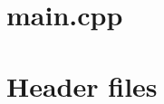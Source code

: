 \documentclass{article}
\begin{document}
\section{main.cpp}\label{appendix:main.cpp}

\section{Header files}\label{appendix:headers}


%




\end{document}

